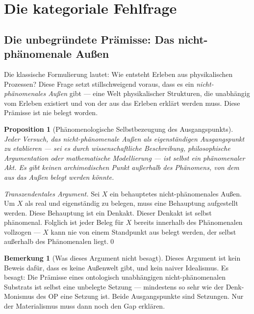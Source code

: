\documentclass[11pt,a4paper]{article}
\theoremstyle{plain}
\newtheorem{proposition}{Proposition}[section]
\theoremstyle{definition}
\newtheorem{remark}{Bemerkung}[section]
\begin{document}
\section{Die kategoriale Fehlfrage}

\subsection{Die unbegr\"{u}ndete Pr\"{a}misse: Das nicht-ph\"{a}nomenale Au\ss{}en}

Die klassische Formulierung lautet: \glqq{}Wie entsteht Erleben aus physikalischen
Prozessen?\grqq{} Diese Frage setzt stillschweigend voraus, dass es ein
\emph{nicht-ph\"{a}nomenales Au\ss{}en} gibt --- eine Welt physikalischer Strukturen,
die unabh\"{a}ngig vom Erleben existiert und von der aus das Erleben erkl\"{a}rt werden
muss. Diese Pr\"{a}misse ist nie belegt worden.

\begin{proposition}[Ph\"{a}nomenologische Selbstbezeugung des Ausgangspunkts]
Jeder Versuch, das nicht-ph\"{a}nomenale Au\ss{}en als eigenst\"{a}ndigen Ausgangspunkt
zu etablieren --- sei es durch wissenschaftliche Beschreibung, philosophische Argumentation
oder mathematische Modellierung --- ist selbst ein ph\"{a}nomenaler Akt. Es gibt keinen
archimedischen Punkt au\ss{}erhalb des Ph\"{a}nomens, von dem aus das Au\ss{}en belegt
werden k\"{o}nnte.
\end{proposition}

\begin{proof}[Transzendentales Argument]
Sei $X$ ein behauptetes nicht-ph\"{a}nomenales Au\ss{}en. Um $X$ als real und eigenst\"{a}ndig
zu belegen, muss eine Behauptung aufgestellt werden. Diese Behauptung ist ein Denkakt.
Dieser Denkakt ist selbst ph\"{a}nomenal. Folglich ist jeder Beleg f\"{u}r $X$ bereits
innerhalb des Ph\"{a}nomenalen vollzogen --- $X$ kann nie von einem Standpunkt aus belegt
werden, der selbst au\ss{}erhalb des Ph\"{a}nomenalen liegt.\qed
\end{proof}

\begin{remark}[Was dieses Argument nicht besagt]
Dieses Argument ist kein Beweis daf\"{u}r, dass es keine Au\ss{}enwelt gibt, und kein
naiver Idealismus. Es besagt: Die Pr\"{a}misse eines ontologisch unabh\"{a}ngigen
nicht-ph\"{a}nomenalen Substrats ist selbst eine unbelegte Setzung --- mindestens so sehr
wie der Denk-Monismus des OP eine Setzung ist. Beide Ausgangspunkte sind Setzungen. Nur
der Materialismus muss dann noch den Gap erkl\"{a}ren.
\end{remark}
\end{document}
